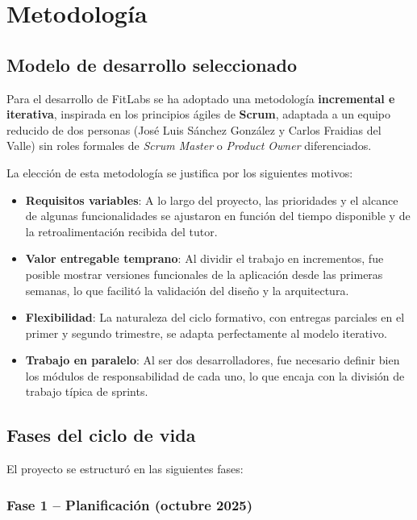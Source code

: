 \chapter{Metodología}

\section{Modelo de desarrollo seleccionado}

Para el desarrollo de FitLabs se ha adoptado una metodología \textbf{incremental e iterativa}, inspirada en los principios ágiles de \textbf{Scrum}, adaptada a un equipo reducido de dos personas (José Luis Sánchez González y Carlos Fraidias del Valle) sin roles formales de \textit{Scrum Master} o \textit{Product Owner} diferenciados.

La elección de esta metodología se justifica por los siguientes motivos:

\begin{itemize}
  \item \textbf{Requisitos variables}: A lo largo del proyecto, las prioridades y el alcance de algunas funcionalidades se ajustaron en función del tiempo disponible y de la retroalimentación recibida del tutor.
  \item \textbf{Valor entregable temprano}: Al dividir el trabajo en incrementos, fue posible mostrar versiones funcionales de la aplicación desde las primeras semanas, lo que facilitó la validación del diseño y la arquitectura.
  \item \textbf{Flexibilidad}: La naturaleza del ciclo formativo, con entregas parciales en el primer y segundo trimestre, se adapta perfectamente al modelo iterativo.
  \item \textbf{Trabajo en paralelo}: Al ser dos desarrolladores, fue necesario definir bien los módulos de responsabilidad de cada uno, lo que encaja con la división de trabajo típica de sprints.
\end{itemize}

\section{Fases del ciclo de vida}

El proyecto se estructuró en las siguientes fases:

\subsection{Fase 1 -- Planificación (octubre 2025)}

